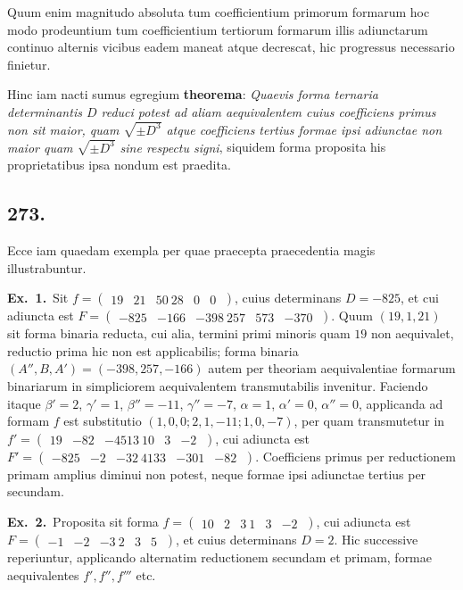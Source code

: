 \documentclass[12pt,a4paper]{article}
\theoremstyle{plain}
\theoremstyle{definition}
\theoremstyle{remark}
\begin{document}
Quum enim magnitudo absoluta tum coefficientium primorum formarum hoc modo prodeuntium tum coefficientium tertiorum formarum illis adiunctarum continuo alternis vicibus eadem maneat atque decrescat, hic progressus necessario finietur.

Hinc iam nacti sumus egregium \textbf{theorema}: \emph{Quaevis forma ternaria determinantis $D$ reduci potest ad aliam aequivalentem cuius coefficiens primus non sit maior, quam $\sqrt{\pm D^3}$ atque coefficiens tertius formae ipsi adiunctae non maior quam $\sqrt{\pm D^3}$ sine respectu signi}, siquidem forma proposita his proprietatibus ipsa nondum est praedita.

\subsection*{273.}

Ecce iam quaedam exempla per quae praecepta praecedentia magis illustrabuntur.

\textbf{Ex.\ 1.}\ Sit $f = \begin{pmatrix} 19 & 21 & 50 \ 28 & 0 & 0 \ \end{pmatrix}$, cuius determinans $D = -825$, et cui adiuncta est $F = \begin{pmatrix} -825 & -166 & -398 \ 257 & 573 & -370 \ \end{pmatrix}$. Quum $(19, 1, 21)$ sit forma binaria reducta, cui alia, termini primi minoris quam $19$ non aequivalet, reductio prima hic non est applicabilis; forma binaria $(A'', B, A') = (-398, 257, -166)$ autem per theoriam aequivalentiae formarum binariarum in simpliciorem aequivalentem transmutabilis invenitur. Faciendo itaque $\beta' = 2$, $\gamma' = 1$, $\beta'' = -11$, $\gamma'' = -7$, $\alpha = 1$, $\alpha' = 0$, $\alpha'' = 0$, applicanda ad formam $f$ est substitutio $(1, 0, 0; 2, 1, -11; 1, 0, -7)$, per quam transmutetur in $f' = \begin{pmatrix} 19 & -82 & -4513 \ 10 & 3 & -2 \ \end{pmatrix}$, cui adiuncta est $F' = \begin{pmatrix} -825 & -2 & -32 \ 4133 & -301 & -82 \ \end{pmatrix}$. Coefficiens primus per reductionem primam amplius diminui non potest, neque formae ipsi adiunctae tertius per secundam.

\textbf{Ex.\ 2.}\ Proposita sit forma $f = \begin{pmatrix} 10 & 2 & 3 \ 1 & 3 & -2 \ \end{pmatrix}$, cui adiuncta est $F = \begin{pmatrix} -1 & -2 & -3 \ 2 & 3 & 5 \ \end{pmatrix}$, et cuius determinans $D = 2$. Hic successive reperiuntur, applicando alternatim reductionem secundam et primam, formae aequivalentes $f', f'', f'''$ etc.
\end{document}
